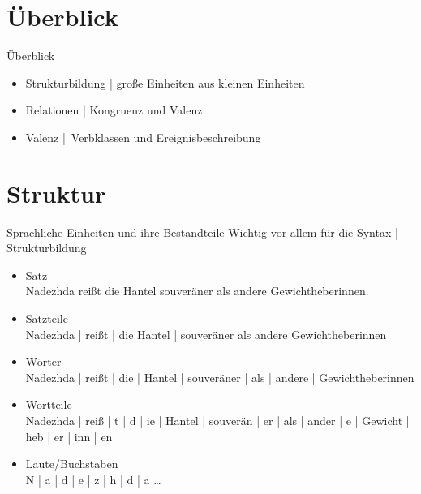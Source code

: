 \section{Überblick}

\begin{frame}
  {Überblick}
  \onslide<+->
  \begin{itemize}[<+->]
    \item \alert{Strukturbildung} | große Einheiten aus kleinen Einheiten
    \Zeile
    \item \alert{Relationen} | Kongruenz und Valenz
    \Zeile
    \item \alert{Valenz} | Verbklassen und Ereignisbeschreibung
  \end{itemize}
\end{frame}

\section{Struktur}

\begin{frame}
  {Sprachliche Einheiten und ihre Bestandteile}
  \onslide<+->
  \onslide<+->
  Wichtig vor allem für die Syntax | \alert{Strukturbildung}\\
  \Zeile
  \begin{itemize}[<+->]
    \item\footnotesize \alert{Satz} \\
      {Nadezhda reißt die Hantel souveräner als andere Gewichtheberinnen.}
      \Halbzeile

    \item\footnotesize \alert{Satzteile} \\
      {Nadezhda | reißt | die Hantel | souveräner als andere Gewichtheberinnen}
      \Halbzeile

    \item\footnotesize \alert{Wörter} \\
      {Nadezhda | reißt | die | Hantel | souveräner | als | andere | Gewichtheberinnen}
      \Halbzeile

    \item\footnotesize \alert{Wortteile} \\
      {Nadezhda | reiß | t | d | ie | Hantel | souverän | er | als | ander | e | Gewicht | heb | er | inn | en}
      \Halbzeile

    \item\footnotesize \alert{Laute\slash Buchstaben} \\
      {N | a | d | e | z | h | d | a \ldots}
  \end{itemize}
\end{frame}


